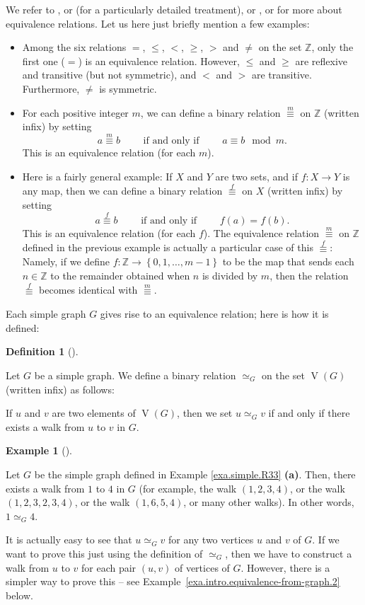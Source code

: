 \documentclass[numbers=enddot,12pt,final,onecolumn,notitlepage]{scrartcl}%
\theoremstyle{definition}
\newtheorem{defi}[theo]{Definition}
\newenvironment{definition}[1][]
{\begin{defi}[#1]\begin{leftbar}}
{\end{leftbar}\end{defi}}
\newtheorem{exam}[theo]{Example}
\newenvironment{example}[1][]
{\begin{exam}[#1]\begin{leftbar}}
{\end{leftbar}\end{exam}}
\newcommand{\ZZ}{\mathbb{Z}}
\newcommand{\set}[1]{\left\{ #1 \right\}}
\newcommand{\tup}[1]{\left( #1 \right)}
\newcommand{\verts}[1]{\operatorname{V}\left( #1 \right)}
\begin{document}
We refer to \cite[\S 10.10]{LeLeMe16}, or \cite[Chapter 11]{Hammac15}
(for a particularly detailed treatment),
or \cite[Chapter 9]{Oggier14}, or \cite[\S 3.E]{Day-proofs}
for more about equivalence relations. Let us here just briefly
mention a few examples:
\begin{itemize}
\item Among the six relations $=$, $\leq$, $<$, $\geq$, $>$ and $\neq$
on the set $\ZZ$, only the first one ($=$) is an equivalence relation.
However, $\leq$ and $\geq$ are reflexive and transitive (but not
symmetric), and $<$ and $>$ are transitive. Furthermore, $\neq$ is
symmetric.
\item For each positive integer $m$, we can define a binary relation
$\overset{m}{\equiv}$ on $\ZZ$ (written infix) by setting
\[
a \overset{m}{\equiv} b
\qquad \text{ if and only if } \qquad
a \equiv b \mod m .
\]
This is an equivalence relation (for each $m$).
\item Here is a fairly general example: If $X$ and $Y$ are two sets,
and if $f : X \to Y$ is any map, then we can define a binary relation
$\overset{f}{\equiv}$ on $X$ (written infix) by setting
\[
a \overset{f}{\equiv} b
\qquad \text{ if and only if } \qquad
f \tup{a} = f \tup{b} .
\]
This is an equivalence relation (for each $f$). The equivalence
relation $\overset{m}{\equiv}$ on $\ZZ$ defined in the previous
example is actually a particular case of this $\overset{f}{\equiv}$:
Namely, if we define $f : \ZZ \to \set{0, 1, \ldots, m-1}$ to be the
map that sends each $n \in \ZZ$ to the remainder obtained when $n$ is
divided by $m$, then the relation $\overset{f}{\equiv}$ becomes
identical with $\overset{m}{\equiv}$.
\end{itemize}

Each simple graph $G$ gives rise to an equivalence relation; here is
how it is defined:

\begin{definition} \label{def.intro.equivalence-from-graph}
Let $G$ be a simple graph. We define a binary relation $\simeq_G$ on
the set $\verts{G}$ (written infix) as follows:

If $u$ and $v$ are two elements of $\verts{G}$, then we set
$u \simeq_G v$ if and only if there exists a walk from $u$ to $v$ in
$G$.
\end{definition}

\begin{example} \label{exa.intro.equivalence-from-graph.1}
Let $G$ be the simple graph defined in
Example \ref{exa.simple.R33} \textbf{(a)}.
Then, there exists a walk from $1$ to $4$ in $G$ (for example,
the walk $\tup{1, 2, 3, 4}$, or the walk
$\tup{1, 2, 3, 2, 3, 4}$, or the walk $\tup{1, 6, 5, 4}$,
or many other walks).
In other words, $1 \simeq_G 4$.

It is actually easy to see that $u \simeq_G v$ for any two
vertices $u$ and $v$ of $G$.
If we want to prove this just using the definition of $\simeq_G$,
then we have to construct a walk from $u$ to $v$ for each pair
$\tup{u, v}$ of vertices of $G$.
However, there is a simpler way to prove this -- see
Example~\ref{exa.intro.equivalence-from-graph.2} below.
\end{example}
\end{document}
